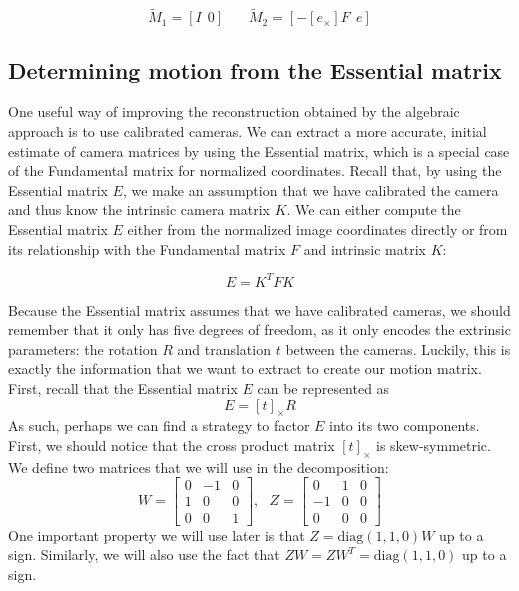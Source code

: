 \documentclass[a4paper, 12pt]{article}
\numberwithin{equation}{section}
\begin{document}
\begin{equation}
    \tilde{M}_1 = [I ~~ 0] ~~~~~~~~ \tilde{M}_2 = [- [e_\times]F ~~ e]
    \label{eq:mm2}
\end{equation}

\subsection{Determining motion from the Essential matrix}
One useful way of improving the reconstruction obtained by the algebraic approach is to use calibrated cameras. We can extract a more accurate, initial estimate of camera matrices by using the Essential matrix, which is a special case of the Fundamental matrix for normalized coordinates. Recall that, by using the Essential matrix $E$, we make an assumption that we have calibrated the camera and thus know the intrinsic camera matrix $K$. We can either compute the Essential matrix $E$ either from the normalized image coordinates directly or from its relationship with the Fundamental matrix $F$ and intrinsic matrix $K$:

\begin{equation}
    E = K^TFK
\end{equation}

Because the Essential matrix assumes that we have calibrated cameras, we should remember that it only has five degrees of freedom, as it only encodes the extrinsic parameters: the rotation $R$ and translation $t$ between the cameras. Luckily, this is exactly the information that we want to extract to create our motion matrix. First, recall that the Essential matrix $E$ can be represented as
\begin{equation}
    E = [t]_\times R
\end{equation}
As such, perhaps we can find a strategy to factor $E$ into its two components. First, we should notice that the cross product matrix $[t]_\times$ is skew-symmetric. We define two matrices that we will use in the decomposition:
\begin{equation}
     W = \begin{bmatrix} 0 & -1 & 0 \\ 1 & 0 & 0 \\ 0 & 0 & 1\end{bmatrix}, ~~~ Z = \begin{bmatrix} 0 & 1 & 0 \\ -1 & 0 & 0 \\ 0 & 0 & 0\end{bmatrix}
\end{equation}
One important property we will use later is that $Z = \mathrm{diag}(1,1,0)W$ up to a sign. Similarly, we will also use the fact that $ZW = ZW^T = \mathrm{diag}(1,1,0)$ up to a sign. 
\end{document}
